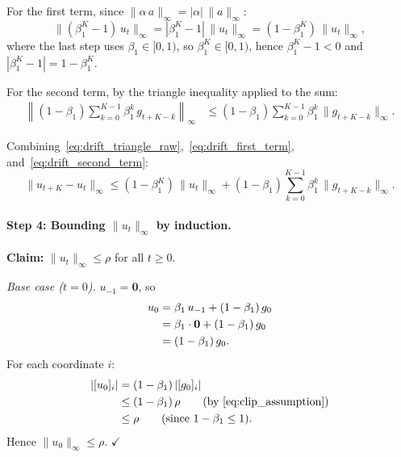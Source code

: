 \documentclass{article}
\begin{document}
For the first term, since $\|\alpha\,a\|_\infty = |\alpha|\,\|a\|_\infty$:
\begin{equation}
\|(\beta_1^K - 1)\,u_t\|_\infty
= |\beta_1^K - 1|\,\|u_t\|_\infty
= (1 - \beta_1^K)\,\|u_t\|_\infty,
\label{eq:drift_first_term}
\end{equation}
where the last step uses $\beta_1 \in [0,1)$, so $\beta_1^K \in [0,1)$,
hence $\beta_1^K - 1 < 0$ and $|\beta_1^K - 1| = 1 - \beta_1^K$.

For the second term, by the triangle inequality applied to the sum:
\begin{align}
\left\|(1-\beta_1)\sum_{k=0}^{K-1}\beta_1^k\,g_{t+K-k}\right\|_\infty
&\leq (1-\beta_1)\sum_{k=0}^{K-1}\beta_1^k\,\|g_{t+K-k}\|_\infty.
\label{eq:drift_second_term}
\end{align}

Combining~\eqref{eq:drift_triangle_raw},~\eqref{eq:drift_first_term},
and~\eqref{eq:drift_second_term}:
\begin{equation}
\|u_{t+K} - u_t\|_\infty
\leq (1-\beta_1^K)\,\|u_t\|_\infty
+ (1-\beta_1)\sum_{k=0}^{K-1}\beta_1^k\,\|g_{t+K-k}\|_\infty.
\label{eq:drift_triangle_combined}
\end{equation}

\paragraph{Step 4: Bounding $\|u_t\|_\infty$ by induction.}

\noindent\textbf{Claim:} $\|u_t\|_\infty \leq \rho$ for all $t \geq 0$.

\emph{Base case ($t = 0$).}
$u_{-1} = \mathbf{0}$, so
\begin{align}
u_0
&= \beta_1\,u_{-1} + (1-\beta_1)\,g_0 \notag \\
&= \beta_1 \cdot \mathbf{0} + (1-\beta_1)\,g_0 \notag \\
&= (1-\beta_1)\,g_0.
\label{eq:drift_u0}
\end{align}
For each coordinate $i$:
\begin{align}
|[u_0]_i|
&= (1-\beta_1)\,|[g_0]_i| \notag \\
&\leq (1-\beta_1)\,\rho
\qquad\text{(by~\eqref{eq:clip_assumption})} \notag \\
&\leq \rho
\qquad\text{(since $1 - \beta_1 \leq 1$)}.
\label{eq:drift_u0_bound}
\end{align}
Hence $\|u_0\|_\infty \leq \rho$. $\checkmark$
\end{document}
